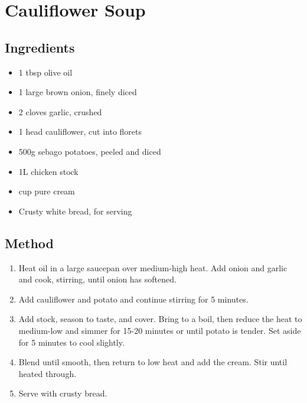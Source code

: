\section{Cauliflower Soup}


\subsection{Ingredients}

\begin{itemize}
	\item 1 tbsp olive oil
	\item 1 large brown onion, finely diced
	\item 2 cloves garlic, crushed
	\item 1 head cauliflower, cut into florets
	\item 500g sebago potatoes, peeled and diced
	\item 1L chicken stock
	\item {} cup pure cream
	\item Crusty white bread, for serving
\end{itemize}

\subsection{Method}

\begin{enumerate}
	\item Heat oil in a large saucepan over medium-high heat. Add onion and garlic and cook, stirring, until onion has softened.
	\item Add cauliflower and potato and continue stirring for 5 minutes.
	\item Add stock, season to taste, and cover. Bring to a boil, then reduce the heat to medium-low and simmer for 15-20 minutes or until potato is tender. Set aside for 5 minutes to cool slightly.
	\item Blend until smooth, then return to low heat and add the cream. Stir until heated through.
	\item Serve with crusty bread.
\end{enumerate}
